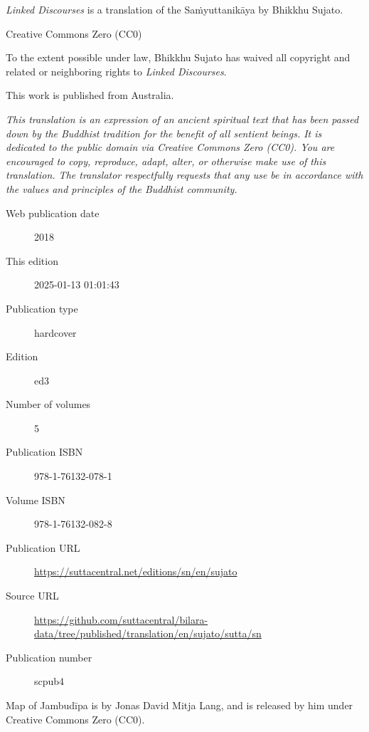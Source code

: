 \documentclass[12pt,openany]{book}%
\begin{document}
\begin{footnotesize}

\textit{Linked Discourses} is a translation of the Saṁyuttanikāya by Bhikkhu Sujato.

\medskip

Creative Commons Zero (CC0)

To the extent possible under law, Bhikkhu Sujato has waived all copyright and related or neighboring rights to \textit{Linked Discourses}.

\medskip

This work is published from Australia.

\begin{center}
\textit{This translation is an expression of an ancient spiritual text that has been passed down by the Buddhist tradition for the benefit of all sentient beings. It is dedicated to the public domain via Creative Commons Zero (CC0). You are encouraged to copy, reproduce, adapt, alter, or otherwise make use of this translation. The translator respectfully requests that any use be in accordance with the values and principles of the Buddhist community.}
\end{center}

\medskip

\begin{description}
    \item[Web publication date] 2018
    \item[This edition] 2025-01-13 01:01:43
    \item[Publication type] hardcover
    \item[Edition] ed3
    \item[Number of volumes] 5
    \item[Publication ISBN] 978-1-76132-078-1
    \item[Volume ISBN] 978-1-76132-082-8
    \item[Publication URL] \href{https://suttacentral.net/editions/sn/en/sujato}{https://suttacentral.net/editions/sn/en/sujato}
    \item[Source URL] \href{https://github.com/suttacentral/bilara-data/tree/published/translation/en/sujato/sutta/sn}{https://github.com/suttacentral/bilara-data/tree/published/translation/en/sujato/sutta/sn}
    \item[Publication number] scpub4
\end{description}

\medskip

Map of Jambudīpa is by Jonas David Mitja Lang, and is released by him under Creative Commons Zero (CC0).


\end{footnotesize}
\end{document}
